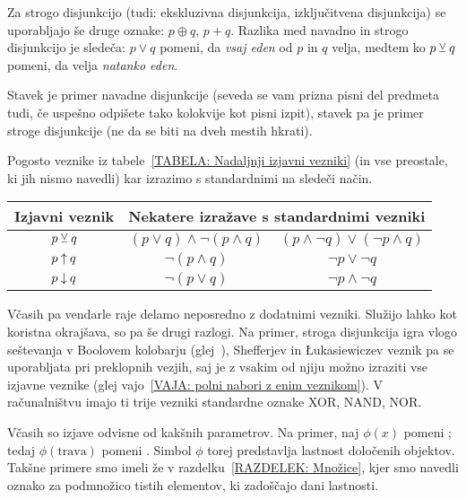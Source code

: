 		Za strogo disjunkcijo (tudi: ekskluzivna disjunkcija, izključitvena disjunkcija) se uporabljajo še druge oznake: $p \oplus q$, $p + q$. Razlika med navadno in strogo disjunkcijo je sledeča: $p \lor q$ pomeni, da \emph{vsaj eden} od $p$ in $q$ velja, medtem ko $p \mathbin{\veebar} q$ pomeni, da velja \emph{natanko eden}.
		
		\begin{zgled}
			Stavek  je primer navadne disjunkcije (seveda se vam prizna pisni del predmeta tudi, če uspešno odpišete tako kolokvije kot pisni izpit), stavek  pa je primer stroge disjunkcije (ne da se biti na dveh mestih hkrati).
		\end{zgled}
		
		Pogosto veznike iz tabele~\ref{TABELA: Nadaljnji izjavni vezniki} (in vse preostale, ki jih nismo navedli) kar izrazimo s standardnimi na sledeči način.
		\begin{center}
			\begin{tabular}{|ccc|}
				\hline
				\textbf{Izjavni veznik} & \multicolumn{2}{c|}{\textbf{Nekatere izražave s standardnimi vezniki}} \\
				\hline
				$p \mathbin{\veebar} q$ & $(p \lor q) \land \lnot(p \land q)$ & $(p \land \lnot{q}) \lor (\lnot{p} \land q)$ \\
				$p \mathbin{\uparrow} q$ & $\lnot(p \land q)$ & $\lnot{p} \lor \lnot{q}$ \\
				$p \mathbin{\downarrow} q$ & $\lnot(p \lor q)$ & $\lnot{p} \land \lnot{q}$ \\
				\hline
			\end{tabular}
		\end{center}
		
		Včasih pa vendarle raje delamo neposredno z dodatnimi vezniki. Služijo lahko kot koristna okrajšava, so pa še drugi razlogi. Na primer, stroga disjunkcija igra vlogo seštevanja v Boolovem kolobarju (glej~), Shefferjev in Łukasiewiczev veznik pa se uporabljata pri preklopnih vezjih, saj je z vsakim od njiju možno izraziti vse izjavne veznike (glej vajo~\ref{VAJA: polni nabori z enim veznikom}). V računalništvu imajo ti trije vezniki standardne oznake XOR, NAND, NOR.
		
		
		Včasih so izjave odvisne od kakšnih parametrov. Na primer, naj $\phi(x)$ pomeni ; tedaj $\phi(\text{trava})$ pomeni . Simbol $\phi$ torej predstavlja lastnost določenih objektov. Takšne primere smo imeli že v razdelku~\ref{RAZDELEK: Množice}, kjer smo navedli oznako za podmnožico tistih elementov, ki zadoščajo dani lastnosti.
		
